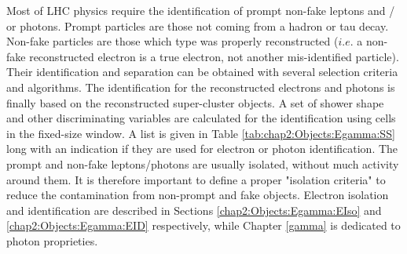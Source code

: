 Most of LHC physics require the identification of prompt non-fake leptons and / or photons. Prompt particles are those not coming from a hadron or tau decay. Non-fake particles are those which type was properly reconstructed ($i.e.$ a non-fake reconstructed electron is a true electron, not another mis-identified particle). Their identification and separation can be obtained with several selection criteria and algorithms. The identification for the reconstructed electrons and photons is finally based on the reconstructed super-cluster objects. A set of shower shape and other discriminating variables are calculated for the identification using cells in the fixed-size window. A list is given in Table \ref{tab:chap2:Objects:Egamma:SS} long with an indication if they are used for electron or photon identification. The prompt and non-fake leptons/photons are usually isolated, without much activity around them. It is therefore important to define a proper "isolation criteria" to reduce the contamination from non-prompt and fake objects. Electron isolation and identification are described in Sections \ref{chap2:Objects:Egamma:EIso} and \ref{chap2:Objects:Egamma:EID} respectively, while Chapter \ref{gamma} is dedicated to photon proprieties.

